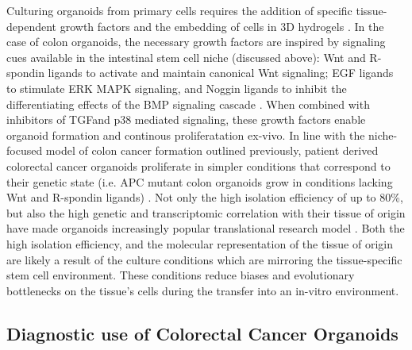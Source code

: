 \begin{flushleft}
Culturing organoids from primary cells requires the addition of specific tissue-dependent growth factors and the embedding of cells in 3D hydrogels \cite{Merker2016GastrointestinalOut}. In the case of colon organoids, the necessary growth factors are inspired by signaling cues available in the intestinal stem cell niche (discussed above): Wnt and R-spondin ligands to activate and maintain canonical Wnt signaling; EGF ligands to stimulate ERK MAPK signaling, and Noggin ligands to inhibit the differentiating effects of the BMP signaling cascade \cite{Sato2013}. When combined with inhibitors of TGF\textbeta and p38 mediated signaling, these growth factors enable organoid formation and continous proliferatation ex-vivo. In line with the niche-focused model of colon cancer formation outlined previously, patient derived colorectal cancer organoids proliferate in simpler conditions that correspond to their genetic state (i.e. APC mutant colon organoids grow in conditions lacking Wnt and R-spondin ligands) \cite{Fujii2016-de}. Not only the high isolation efficiency of up to 80\%, but also the high genetic and transcriptomic correlation with their tissue of origin have made organoids increasingly popular translational research model \cite{pauliPersonalizedVitroVivo2017a}. Both the high isolation efficiency, and the molecular representation of the tissue of origin are likely a result of the culture conditions which are mirroring the tissue-specific stem cell environment. These conditions reduce biases and evolutionary bottlenecks on the tissue's cells during the transfer into an in-vitro environment. \par

\subsection{Diagnostic use of Colorectal Cancer Organoids}


\end{flushleft}
